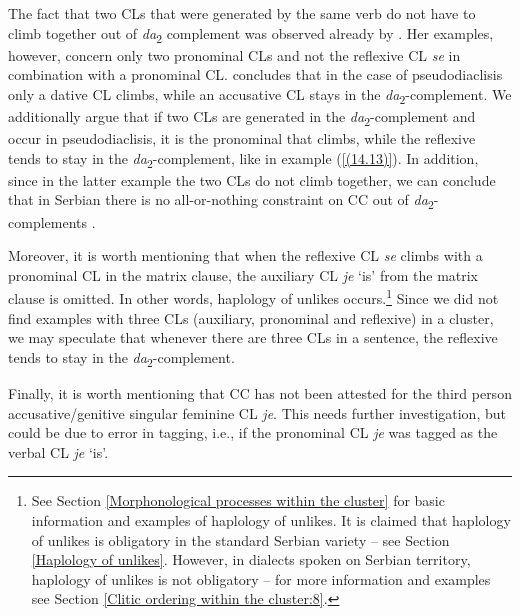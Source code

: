 \noindent The fact that two CLs that were generated by the same verb do not have to climb together out of \textit{da}\textsubscript{2} complement was observed already by \citet[182]{Stjepanovic04}. Her examples, however, concern only two pronominal CLs and not the reflexive CL \textit{se} in combination with a pronominal CL. \citet[182]{Stjepanovic04} concludes that in the case of pseudodiaclisis  only a dative CL climbs, while an accusative CL stays in the \textit{da}\textsubscript{2}-complement. We additionally argue that if two CLs are generated in the \textit{da}\textsubscript{2}-complement and occur in pseudodiaclisis, it is the pronominal that climbs, while the reflexive tends to stay in the \textit{da}\textsubscript{2}-complement, like in example (\ref{(14.13)}). In addition, since in the latter example the two CLs do not climb together, we can conclude that in Serbian there is no all-or-nothing constraint on CC  out of \textit{da}\textsubscript{2}-complements \citep[pace][8]{Rezac05}.

Moreover, it is worth mentioning that when the reflexive CL \textit{se} climbs with a pronominal CL in the matrix clause, the auxiliary CL \textit{je}  ‘is’ from the matrix clause is omitted. In other words, haplology of unlikes occurs.\footnote{See Section \ref{Morphonological processes within the cluster} for basic information and examples of haplology of unlikes. It is claimed that haplology of unlikes is obligatory in the standard Serbian variety – see Section \ref{Haplology of unlikes}. However, in dialects spoken on Serbian territory, haplology of unlikes is not obligatory – for more information and examples see Section \ref{Clitic ordering within the cluster:8}.} Since we did not find examples with three CLs (auxiliary, pronominal and reflexive) in a cluster, we may speculate that whenever there are three CLs in a sentence, the reflexive tends to stay in the \textit{da}\textsubscript{2}-complement.

Finally, it is worth mentioning that CC has not been attested for the third person accusative/genitive singular feminine CL \textit{je}. This needs further investigation, but could be due to error in tagging, i.e., if the pronominal CL \textit{je} was tagged as the verbal CL \textit{je} ‘is’. 

